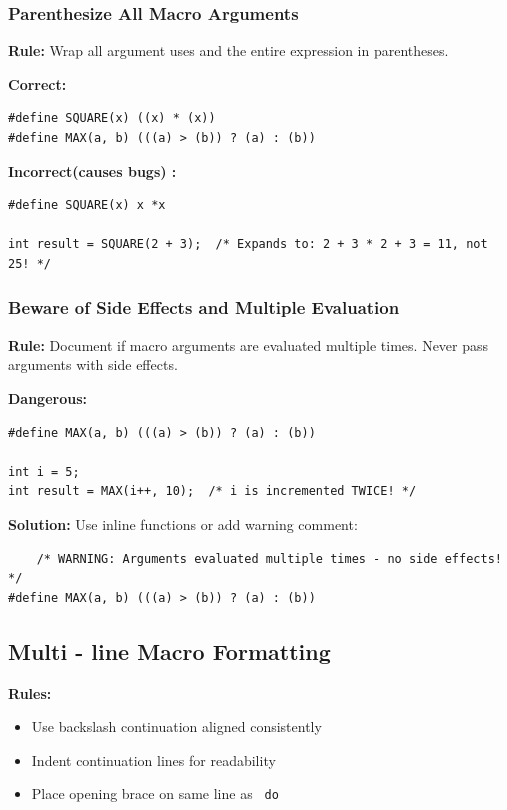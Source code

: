 \subsubsection{Parenthesize All Macro Arguments}

\textbf{Rule:} Wrap all argument uses and the entire expression in parentheses.

\textbf{Correct:}
\begin{verbatim}
#define SQUARE(x) ((x) * (x))
#define MAX(a, b) (((a) > (b)) ? (a) : (b))
\end{verbatim}

\textbf{Incorrect(causes bugs) :}
\begin{verbatim}
#define SQUARE(x) x *x

int result = SQUARE(2 + 3);  /* Expands to: 2 + 3 * 2 + 3 = 11, not 25! */
\end{verbatim}

\subsubsection{Beware of Side Effects and Multiple Evaluation}

\textbf{Rule:} Document if macro arguments are evaluated multiple times. Never pass arguments with side effects.

\textbf{Dangerous:}
\begin{verbatim}
#define MAX(a, b) (((a) > (b)) ? (a) : (b))

int i = 5;
int result = MAX(i++, 10);  /* i is incremented TWICE! */
\end{verbatim}

\textbf{Solution:} Use inline functions or add warning comment:
\begin{verbatim}
    /* WARNING: Arguments evaluated multiple times - no side effects! */
#define MAX(a, b) (((a) > (b)) ? (a) : (b))
\end{verbatim}

\subsection{Multi - line Macro Formatting}

\textbf{Rules:}
\begin{itemize}
    \item Use backslash continuation aligned consistently
    \item Indent continuation lines for readability
    \item Place opening brace on same line as \texttt{
      do}
\end{itemize}

